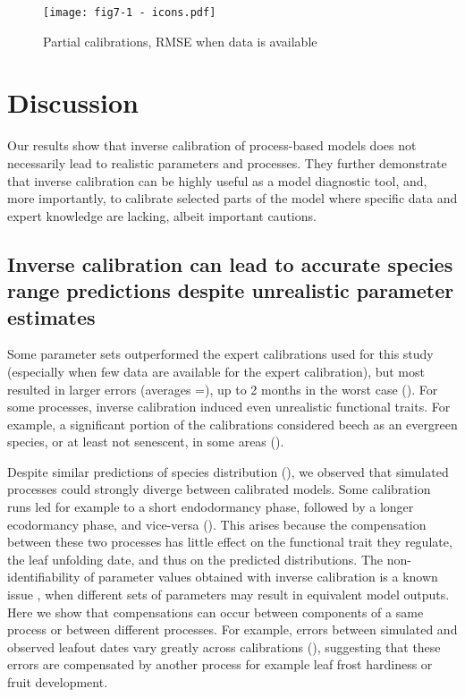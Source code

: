 \documentclass[letterpaper,8pt]{extarticle}  %
\begin{document}
\begin{doublespacing}
\begin{linenumbers}
\begin{itemize}
\begin{figure}[htpb]
\hspace*{-1cm}
\centering
\begin{subcaptiongroup}
\label{fig:5A} 
\label{fig:5B}
\label{fig:5C}
\end{subcaptiongroup}
\texttt{[image: fig7-1 - icons.pdf]}
\caption{Partial calibrations, RMSE when data is available}
\label{fig:5}
\end{figure}

\end{itemize}

\section{Discussion}

Our results show that inverse calibration of process-based models does not necessarily lead to realistic parameters and processes. They further demonstrate that inverse calibration can be highly useful as a model diagnostic tool, and, more importantly, to calibrate selected parts of the model where specific data and expert knowledge are lacking, albeit important cautions.

\subsection{Inverse calibration can lead to accurate species range predictions despite unrealistic parameter estimates}

Some parameter sets outperformed the expert calibrations used for this study (especially when few data are available for the expert calibration), but most resulted in larger errors (averages =), up to 2 months in the worst case (). For some processes, inverse calibration induced even unrealistic functional traits. For example, a significant portion of the calibrations considered beech as an evergreen species, or at least not senescent, in some areas ().

Despite similar predictions of species distribution (), we observed that simulated processes could strongly diverge between calibrated models. Some calibration runs led for example to a short endodormancy phase, followed by a longer ecodormancy phase, and vice-versa (). This arises because the compensation between these two processes has little effect on the functional trait they regulate, the leaf unfolding date, and thus on the predicted distributions. The non-identifiability of parameter values obtained with inverse calibration is a known issue \citep{He2017, Cameron2022, VanderMeersch2023}, when different sets of parameters may result in equivalent model outputs. Here we show that compensations can occur between components of a same process or between different processes. For example, errors between simulated and observed leafout dates vary greatly across calibrations (), suggesting that these errors are compensated by another process for example leaf frost hardiness or fruit development. 


\end{linenumbers}
\end{doublespacing}
\end{document}
